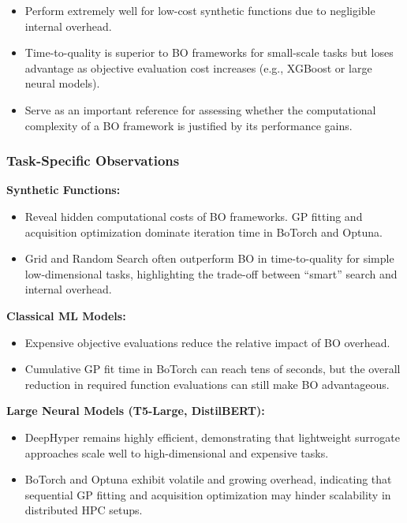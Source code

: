 \documentclass[11pt]{article}
\begin{document}
\begin{itemize}
    \item Perform extremely well for low-cost synthetic functions due to negligible internal overhead.
    \item Time-to-quality is superior to BO frameworks for small-scale tasks but loses advantage as objective evaluation cost increases (e.g., XGBoost or large neural models).
    \item Serve as an important reference for assessing whether the computational complexity of a BO framework is justified by its performance gains.
\end{itemize}

\subsubsection{ Task-Specific Observations}

\textbf{Synthetic Functions:}

\begin{itemize}
    \item Reveal hidden computational costs of BO frameworks. GP fitting and acquisition optimization dominate iteration time in BoTorch and Optuna.
    \item Grid and Random Search often outperform BO in time-to-quality for simple low-dimensional tasks, highlighting the trade-off between “smart” search and internal overhead.
\end{itemize}
\textbf{Classical ML Models:}

\begin{itemize}
    \item Expensive objective evaluations reduce the relative impact of BO overhead.
    \item Cumulative GP fit time in BoTorch can reach tens of seconds, but the overall reduction in required function evaluations can still make BO advantageous.
\end{itemize}
\textbf{Large Neural Models (T5-Large, DistilBERT):}

\begin{itemize}
    \item DeepHyper remains highly efficient, demonstrating that lightweight surrogate approaches scale well to high-dimensional and expensive tasks.
    \item BoTorch and Optuna exhibit volatile and growing overhead, indicating that sequential GP fitting and acquisition optimization may hinder scalability in distributed HPC setups.
\end{itemize}
\end{document}
